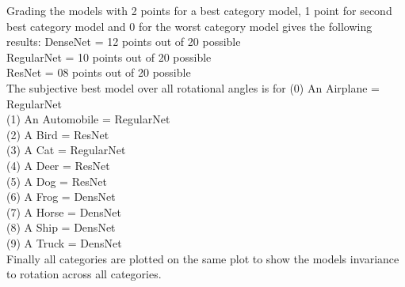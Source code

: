 Grading the models with 2 points for a best category model, 1 point for second best category model and 0 for the worst category model gives the following results:
DenseNet   = 12 points out of 20 possible\\
RegularNet = 10 points out of 20 possible\\
ResNet     = 08 points out of 20 possible\\

The subjective best model over all rotational angles is for
(0) An Airplane   = RegularNet\\
(1) An Automobile = RegularNet\\
(2) A Bird        = ResNet\\ 
(3) A Cat         = RegularNet\\
(4) A Deer        = ResNet\\
(5) A Dog         = ResNet\\
(6) A Frog        = DensNet\\
(7) A Horse       = DensNet\\
(8) A Ship        = DensNet\\
(9) A Truck       = DensNet\\

Finally all categories are plotted on the same plot to show the models invariance to rotation across all categories.
